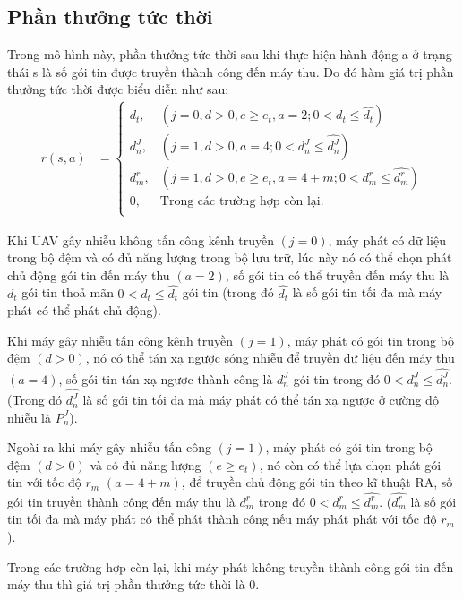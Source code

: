 \documentclass{uetgraduation}
\begin{document}
\subsection{Phần thưởng tức thời}
Trong mô hình này, phần thưởng tức thời sau khi thực hiện hành động a ở trạng thái s là số gói tin được truyền thành công đến máy thu. Do đó hàm giá
trị phần thưởng tức thời được biểu diễn như sau:
\begin{equation}
    \begin{split}
        r(s,a) &= \begin{cases}
            d_t, & (j = 0, d > 0, e \geq e_t, a = 2; 0 < d_t \leq \hat{d_t}) \\
            d_n^J, & (j = 1, d > 0, a = 4; 0 < d_n^J \leq \hat{d_n^J}) \\
            d_m^r, & (j = 1, d > 0, e \geq e_t, a = 4 + m; 0 < d_m^r \leq \hat{d_m^r}) \\
            0, & \text{Trong các trường hợp còn lại.} \\
        \end{cases}
    \end{split}
\end{equation}

Khi UAV gây nhiễu không tấn công kênh truyền $(j = 0)$, máy phát có dữ liệu trong bộ đệm và có đủ năng lượng trong bộ lưu trữ, lúc này nó có thể chọn phát
chủ động gói tin đến máy thu $(a = 2)$, số gói tin có thể truyền đến máy thu là $d_t$ gói tin thoả mãn $0 < d_t \leq \hat{d_t}$ gói tin (trong đó $\hat{d_t}$
là số gói tin tối đa mà máy phát có thể phát chủ động).

Khi máy gây nhiễu tấn công kênh truyền $(j = 1)$, máy phát có gói tin trong bộ đệm $(d > 0)$, nó có thể tán xạ ngược sóng nhiễu để truyền dữ liệu đến máy thu $(a = 4)$, 
số gói tin tán xạ ngược thành công là $d_n^J$ gói tin trong đó $0 < d_n^J \leq \hat{d_n^J}$. (Trong đó $\hat{d_n^J}$ là số gói tin tối đa mà máy phát có thể tán xạ ngược
ở cường độ nhiễu là $P_n^J$).

Ngoài ra khi máy gây nhiễu tấn công $(j = 1)$, máy phát có gói tin trong bộ đệm $(d > 0)$ và có đủ năng lượng $(e \geq e_t)$, nó còn có thể lựa chọn phát gói 
tin với tốc độ $r_m$ $(a = 4 + m)$, để truyền chủ động gói tin theo kĩ thuật RA, số gói tin truyền thành công đến máy thu là $d_m^r$ trong đó $0 < d_m^r \leq \hat{d_m^r}$.
($\hat{d_m^r}$ là số gói tin tối đa mà máy phát có thể phát thành công nếu máy phát phát với tốc độ $r_m$).

Trong các trường hợp còn lại, khi máy phát không truyền thành công gói tin đến máy thu thì giá trị phần thưởng tức thời là 0.
\end{document}
